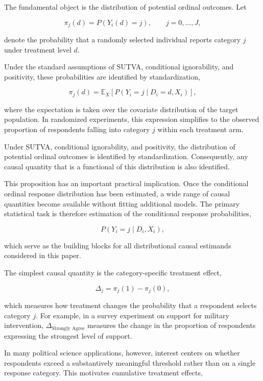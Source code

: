 \documentclass{article}
\begin{document}
The fundamental object is the distribution of potential ordinal outcomes. Let

\[
\pi_j(d) = P\left( Y_i(d)=j \right),
\qquad j=0,\ldots,J,
\]

denote the probability that a randomly selected individual reports category $j$ under treatment level $d$.

Under the standard assumptions of SUTVA, conditional ignorability, and positivity, these probabilities are identified by standardization,

\[
\pi_j(d) = \mathbb{E}_X\left[P\left( Y_i=j \mid D_i=d,X_i \right)\right],
\]

where the expectation is taken over the covariate distribution of the target population. In randomized experiments, this expression simplifies to the observed proportion of respondents falling into category $j$ within each treatment arm.

\begin{proposition}
Under SUTVA, conditional ignorability, and positivity, the distribution of potential ordinal outcomes is identified by standardization. Consequently, any causal quantity that is a functional of this distribution is also identified.
\end{proposition}

This proposition has an important practical implication. Once the conditional ordinal response distribution has been estimated, a wide range of causal quantities become available without fitting additional models. The primary statistical task is therefore estimation of the conditional response probabilities,

\[
P(Y_i=j\mid D_i,X_i),
\]

which serve as the building blocks for all distributional causal estimands considered in this paper.

The simplest causal quantity is the category-specific treatment effect,

\[
\Delta_j = \pi_j(1)-\pi_j(0),
\]

which measures how treatment changes the probability that a respondent selects category $j$. For example, in a survey experiment on support for military intervention, $\Delta_{\text{Strongly Agree}}$ measures the change in the proportion of respondents expressing the strongest level of support.

In many political science applications, however, interest centers on whether respondents exceed a substantively meaningful threshold rather than on a single response category. This motivates cumulative treatment effects,
\end{document}
